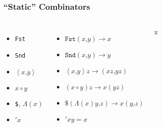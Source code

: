 \documentclass{beamer}
\begin{document}
\begin{frame}
	\frametitle{``Static'' Combinators}
	\begin{columns}[T]
		\begin{itemize}
			\item<1-> \texttt{Fst}
			\item<1-> \texttt{Snd}
			\item<2-> $\left<x\texttt{,}y\right>$
			\item<3-> $x \circ y$
			\item<4-> \texttt{\$}, $\Lambda\left(x\right)$
			\item<5-> $'x$
		\end{itemize}

		\begin{itemize}
			\item<1-> $\texttt{Fst}\left(x\texttt{,}y\right)\rightarrow x$
			\item<1-> $\texttt{Snd}\left(x\texttt{,}y\right)\rightarrow y$
			\item<2-> $\left<x\texttt{,}y\right>z\rightarrow\left(xz\texttt{,}yz\right)$
			\item<3-> $\left(x \circ y\right)z\rightarrow x\left(yz\right)$
			\item<4-> $\texttt{\$}\left(\Lambda\left(x\right)y\texttt{,}z\right)\rightarrow x\left(y\texttt{,}z\right)$
			\item<5-> $'xy = x$
		\end{itemize}

		x
	\end{columns}
\end{frame}
\end{document}
